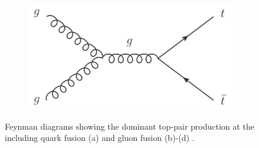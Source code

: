 \begin{figure}
\begin{subfigure}[t]{0.49\textwidth}
  \end{subfigure}
  \begin{subfigure}[t]{0.49\textwidth}
   \includegraphics[width=\textwidth]{figures/ttbard.pdf}
  \end{subfigure}
 \caption[Feynman diagrams showing the dominant top-pair production at the {\LHC}.]{Feynman diagrams showing the dominant top-pair production at the {\LHC} including quark fusion (a) and gluon fusion (b)-(d) \cite{Feynmanttbar}.}
 \label{ttbarproduction}
\end{figure}
%
